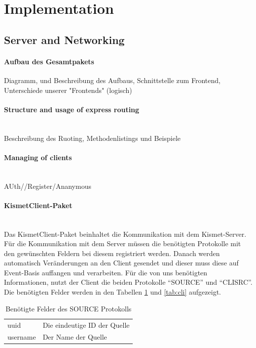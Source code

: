 \documentclass[a4paper]{spie}  %
\begin{document}
\section{Implementation}
\subsection{Server and Networking}
\paragraph{Aufbau des Gesamtpakets}
Diagramm, und Beschreibung des Aufbaus, Schnittstelle zum Frontend, Unterschiede unserer "Frontends" (logisch)
\paragraph{Structure and usage of express routing}\mbox{}\\
Beschreibung des Ruoting, Methodenlistings und Beispiele
\paragraph{Managing of clients}\mbox{}\\
AUth//Register/Ananymous

\paragraph{KismetClient-Paket}\mbox{}\\
Das KismetClient-Paket beinhaltet die Kommunikation mit dem Kismet-Server. Für die Kommunikation mit dem Server müssen die benötigten Protokolle mit den gewünschten Feldern bei diesem registriert werden. Danach werden automatisch Veränderungen an den Client gesendet und dieser muss diese auf Event-Basis auffangen und verarbeiten. Für die von uns benötigten Informationen, nutzt der Client die beiden Protokolle \enquote{SOURCE} und \enquote{CLISRC}. Die benötigten Felder werden in den Tabellen \ref{tab:src} und \ref{tab:cli} aufgezeigt.


\begin{table}[!h]
	\centering
	\begin{tabular}{ | p{} | p{} | }
		\hline 
		\rowcolor{blau} \multicolumn{2}{l|}{\textcolor{white}{\textbf{SOURCE}}}  \\ \hline
		uuid & Die eindeutige ID der Quelle \\ \hline
		username & Der Name der Quelle \\
		\hline
	\end{tabular}
	\caption{Benötigte Felder des SOURCE Protokolls}
	\label{tab:src}
\end{table}
\end{document}
